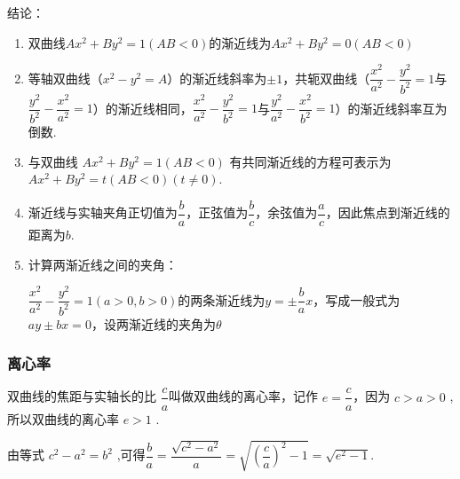 结论：
\begin{enumerate}
    \item 双曲线$Ax^2+By^2 = 1 (AB < 0)$的渐近线为$Ax^2+By^2 = 0 (AB < 0)$
    \item 等轴双曲线（$x^2-y^2 = A$）的渐近线斜率为$\pm 1$，共轭双曲线（$\dfrac{{x}^{2}}{{a}^{2}} - \dfrac{{y}^{2}}{{b}^{2}} = 1$与$\dfrac{{y}^{2}}{{b}^{2}} - \dfrac{{x}^{2}}{{a}^{2}} = 1$）的渐近线相同，$\dfrac{{x}^{2}}{{a}^{2}} - \dfrac{{y}^{2}}{{b}^{2}} = 1$与$\dfrac{{y}^{2}}{{a}^{2}} - \dfrac{{x}^{2}}{{b}^{2}} =  1$）的渐近线斜率互为倒数.
    \item 与双曲线 $Ax^2+By^2 = 1 (AB < 0)$ 有共同渐近线的方程可表示为 $Ax^2+By^2 = t (AB < 0) \left( {t \neq  0}\right)$.
    \item 渐近线与实轴夹角正切值为$\dfrac{b}{a}$，正弦值为$\dfrac{b}{c}$，余弦值为$\dfrac{a}{c}$，因此焦点到渐近线的距离为$b$.
    \item 计算两渐近线之间的夹角：
    
    $\dfrac{{x}^{2}}{{a}^{2}} - \dfrac{{y}^{2}}{{b}^{2}} = 1\left( {a > 0,b > 0}\right)$的两条渐近线为$y = \pm \dfrac{b}{a}x$，写成一般式为$ay \pm bx = 0$，设两渐近线的夹角为$\theta$
\end{enumerate}




\subsubsection*{离心率}

双曲线的焦距与实轴长的比 $\dfrac{c}{a}$叫做双曲线的离心率，记作 $e = \dfrac{c}{a}$，因为 $c > a > 0$ ,所以双曲线的离心率 $e > 1$ . 

由等式 ${c}^{2} - {a}^{2} = {b}^{2}$ ,可得$\dfrac{b}{a} = \dfrac{\sqrt{{c}^{2} - {a}^{2}}}{a} = \sqrt{{\left( \dfrac{c}{a}\right) }^{2} - 1} = \sqrt{{e}^{2} - 1}.$

